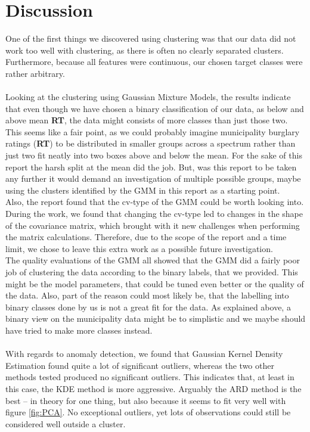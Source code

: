 \documentclass[11pt,fleqn]{article}
\numberwithin{footnote}{section}
\numberwithin{figure}{section}
\numberwithin{table}{section}
\begin{document}
\section{Discussion}
One of the first things we discovered using clustering was that our data did not work too well with clustering, as there is often no clearly separated clusters. Furthermore, because all features were continuous, our chosen target classes were rather arbitrary.
\\\\
Looking at the clustering using Gaussian Mixture Models, the results indicate that even though we have chosen a binary classification of our data, as below and above mean \textbf{RT}, the data might consists of more classes than just those two. This seems like a fair point, as we could probably imagine municipality burglary ratings (\textbf{RT}) to be distributed in smaller groups across a spectrum rather than just two fit neatly into two boxes above and below the mean. For the sake of this report the harsh split at the mean did the job. But, was this report to be taken any further it  would demand an investigation of multiple possible groups, maybe using the clusters identified by the GMM in this report as a starting point.
\\
Also, the report found that the cv-type of the GMM could be worth looking into. During the work, we found that changing the cv-type led to changes in the shape of the covariance matrix, which brought with it new challenges when performing the matrix calculations. Therefore, due to the scope of the report and a time limit, we chose to leave this extra work as a possible future investigation.
\\
The quality evaluations of the GMM all showed that the GMM did a fairly poor job of clustering the data according to the binary labels, that we provided. This might be the model parameters, that could be tuned even better or the quality of the data. Also, part of the reason could most likely be, that the labelling into binary classes done by us is not a great fit for the data. As explained above, a binary view on the municipality data might be to simplistic and we maybe should have tried to make more classes instead.
\\\\
With regards to anomaly detection, we found that Gaussian Kernel Density Estimation found quite a lot of significant outliers, whereas the two other methods tested produced no significant outliers. This indicates that, at least in this case, the KDE method is more aggressive. Arguably the ARD method is the best -- in theory for one thing, but also because it seems to fit very well with figure \ref{fig:PCA}. No exceptional outliers, yet lots of observations could still be considered well outside a cluster.
\end{document}
